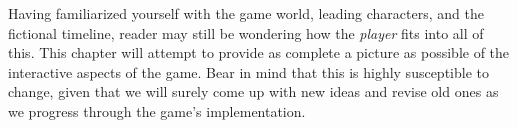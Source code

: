 
Having familiarized yourself with the game world, leading characters, and the fictional timeline, reader may still be wondering how the {\it player} fits into all of this. This chapter will attempt to provide as complete a picture as possible of the interactive aspects of the game. Bear in mind that this is highly susceptible to change, given that we will surely come up with new ideas and revise old ones as we progress through the game's implementation.


\page 
\page 
\page 
\page 


\StopChapter

